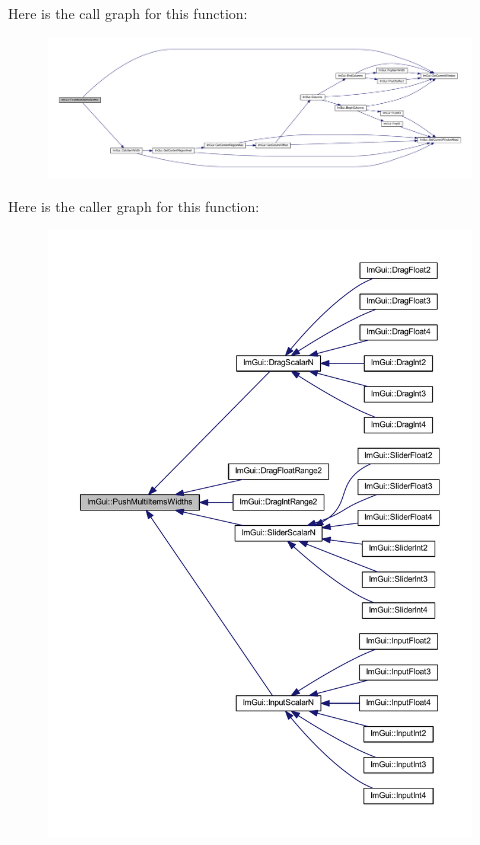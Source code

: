 Here is the call graph for this function\+:
\nopagebreak
\begin{figure}[H]
\begin{center}
\leavevmode
\includegraphics[width=350pt]{namespace_im_gui_ab913605fcf6d405d102cdf56cd414a5a_cgraph}
\end{center}
\end{figure}
Here is the caller graph for this function\+:
\nopagebreak
\begin{figure}[H]
\begin{center}
\leavevmode
\includegraphics[width=350pt]{namespace_im_gui_ab913605fcf6d405d102cdf56cd414a5a_icgraph}
\end{center}
\end{figure}
\mbox{\label{namespace_im_gui_a77ee84afb636e05eb4b2d6eeddcc2aa8}} 
